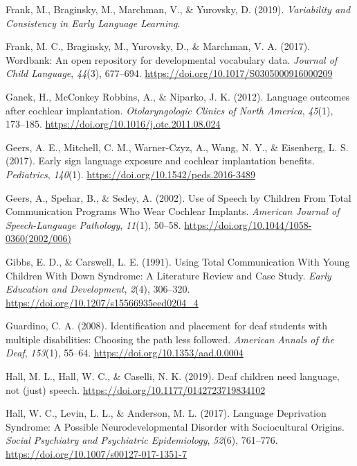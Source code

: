 \documentclass[
  english,
  man]{apa6}
\begin{document}
\leavevmode\hypertarget{ref-frank2019}{}%
Frank, M., Braginsky, M., Marchman, V., \& Yurovsky, D. (2019). \emph{Variability and Consistency in Early Language Learning}.

\leavevmode\hypertarget{ref-frank2017}{}%
Frank, M. C., Braginsky, M., Yurovsky, D., \& Marchman, V. A. (2017). Wordbank: An open repository for developmental vocabulary data. \emph{Journal of Child Language}, \emph{44}(3), 677--694. \url{https://doi.org/10.1017/S0305000916000209}

\leavevmode\hypertarget{ref-ganek2012}{}%
Ganek, H., McConkey Robbins, A., \& Niparko, J. K. (2012). Language outcomes after cochlear implantation. \emph{Otolaryngologic Clinics of North America}, \emph{45}(1), 173--185. \url{https://doi.org/10.1016/j.otc.2011.08.024}

\leavevmode\hypertarget{ref-geers2017}{}%
Geers, A. E., Mitchell, C. M., Warner-Czyz, A., Wang, N. Y., \& Eisenberg, L. S. (2017). Early sign language exposure and cochlear implantation benefits. \emph{Pediatrics}, \emph{140}(1). \url{https://doi.org/10.1542/peds.2016-3489}

\leavevmode\hypertarget{ref-geers2002}{}%
Geers, A., Spehar, B., \& Sedey, A. (2002). Use of Speech by Children From Total Communication Programs Who Wear Cochlear Implants. \emph{American Journal of Speech-Language Pathology}, \emph{11}(1), 50--58. \url{https://doi.org/10.1044/1058-0360(2002/006)}

\leavevmode\hypertarget{ref-gibbs1991}{}%
Gibbs, E. D., \& Carswell, L. E. (1991). Using Total Communication With Young Children With Down Syndrome: A Literature Review and Case Study. \emph{Early Education and Development}, \emph{2}(4), 306--320. \url{https://doi.org/10.1207/s15566935eed0204_4}

\leavevmode\hypertarget{ref-guardino2008}{}%
Guardino, C. A. (2008). Identification and placement for deaf students with multiple disabilities: Choosing the path less followed. \emph{American Annals of the Deaf}, \emph{153}(1), 55--64. \url{https://doi.org/10.1353/aad.0.0004}

\leavevmode\hypertarget{ref-hall2019}{}%
Hall, M. L., Hall, W. C., \& Caselli, N. K. (2019). Deaf children need language, not (just) speech. \url{https://doi.org/10.1177/0142723719834102}

\leavevmode\hypertarget{ref-hall2017}{}%
Hall, W. C., Levin, L. L., \& Anderson, M. L. (2017). Language Deprivation Syndrome: A Possible Neurodevelopmental Disorder with Sociocultural Origins. \emph{Social Psychiatry and Psychiatric Epidemiology}, \emph{52}(6), 761--776. \url{https://doi.org/10.1007/s00127-017-1351-7}
\end{document}
